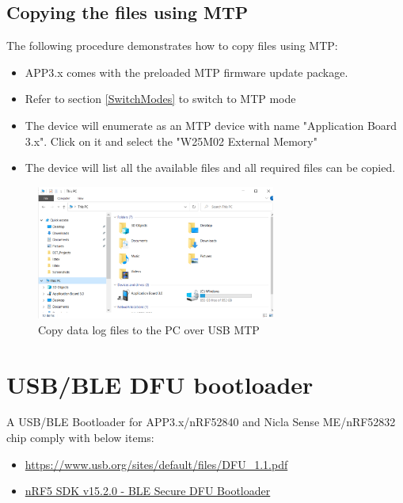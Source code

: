 \documentclass[11pt,headings=small]{scrartcl}
\begin{document}
\subsection{Copying the files using MTP}
The following procedure demonstrates how to copy files using MTP:
\begin{itemize}
	\item APP3.x comes with the preloaded MTP firmware update package.
	\item Refer to section \ref{SwitchModes} to switch to MTP mode
	\item The device will enumerate as an MTP device with name "Application Board 3.x". Click on it and select the "W25M02 External Memory"
	\item The device will list all the available files and all required files can be copied.
\end{itemize}

\begin{figure}[H]
	\begin{center}
		\includegraphics[width=0.7\textwidth]{coinesAPI_images/MTP_windows.png}
		\caption{Copy data log files to the PC over USB MTP}
	\end{center}
\end{figure}

\newpage
\section{USB/BLE DFU bootloader}

A USB/BLE  Bootloader for APP3.x/nRF52840 and Nicla Sense ME/nRF52832 chip comply with below items:

\begin{itemize}
	\item \url{https://www.usb.org/sites/default/files/DFU_1.1.pdf}
	\item \href{https://infocenter.nordicsemi.com/index.jsp?topic=%2Fcom.nordic.infocenter.sdk5.v15.2.0%2Fble_sdk_app_dfu_bootloader.html&cp=9_5_3_4_1_3}{nRF5 SDK v15.2.0 - BLE Secure DFU Bootloader}
\end{itemize}
\end{document}
